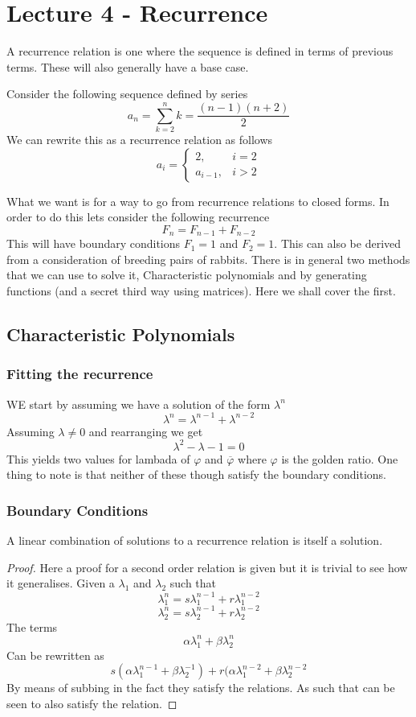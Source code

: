 \documentclass{article}
\begin{document}
\section{Lecture 4 - Recurrence}
\begin{definition}
    A recurrence relation is one where the sequence is defined in terms of previous terms. These will also generally have a base case.
\end{definition}
\begin{example}
    Consider the following sequence defined by series 
    \[a_n = \sum_{k=2}^{n}k = \frac{(n-1)(n+2)}{2}\]
    We can rewrite this as a recurrence relation as follows
    \[a_i = \begin{cases}
        2 ,&i=2 \\
        a_{i-1} ,&i>2
    \end{cases}\]
\end{example}
What we want is for a way to go from recurrence relations to closed forms. In order to do this lets consider the following recurrence
\[F_n = F_{n-1} + F_{n-2}\]
This will have boundary conditions $F_1 = 1$ and $F_2 = 1$. This can also be derived from a consideration of breeding pairs of rabbits. There is in general two methods that we can use to solve it, Characteristic polynomials and by generating functions (and a secret third way using matrices). Here we shall cover the first.
\subsection{Characteristic Polynomials}
\subsubsection{Fitting the recurrence}
WE start by assuming we have a solution of the form $\lambda^n$
\[\lambda^n = \lambda^{n-1} + \lambda^{n-2}\]
Assuming $\lambda \ne 0$ and rearranging we get
\[\lambda^2 - \lambda - 1 = 0\]
This yields two values for lambada of $\varphi$ and $\overline{\varphi}$ where $\varphi$ is the golden ratio. One thing to note is that neither of these though satisfy the boundary conditions.
\subsubsection{Boundary Conditions}
\begin{proposition}
    A linear combination of solutions to a recurrence relation is itself a solution.
\end{proposition}
\begin{proof}
    Here a proof for a second order relation is given but it is trivial to see how it generalises. Given a $\lambda_1$ and $\lambda_2$ such that 
    \[\lambda_1^n = s\lambda_1^{n-1} + r\lambda_1^{n-2}\]
    \[\lambda_2^n = s\lambda_2^{n-1} + r\lambda_2^{n-2}\]
    The terms
    \[\alpha\lambda_1^n + \beta\lambda_2^n\]
    Can be rewritten as 
    \[s(\alpha\lambda_1^{n-1} + \beta\lambda_2^{-1}) + r(\alpha\lambda_1^{n-2} + \beta\lambda_2^{n-2}\]
    By means of subbing in the fact they satisfy the relations. As such that can be seen to also satisfy the relation.
\end{proof}
\end{document}
